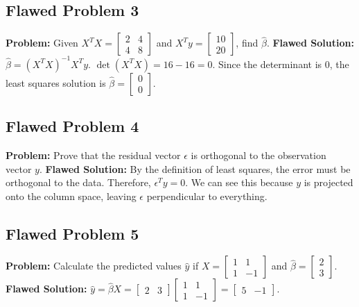 \documentclass[11pt, letterpaper]{article}
\theoremstyle{definition}
\theoremstyle{remark}
\begin{document}
\subsection*{Flawed Problem 3}
\textbf{Problem:} Given $X^T X = \begin{bmatrix} 2 & 4 \\ 4 & 8 \end{bmatrix}$ and $X^T y = \begin{bmatrix} 10 \\ 20 \end{bmatrix}$, find $\hat{\beta}$.
\textbf{Flawed Solution:}
$\hat{\beta} = (X^T X)^{-1} X^T y$.
$\det(X^T X) = 16 - 16 = 0$. Since the determinant is 0, the least squares solution is $\hat{\beta} = \begin{bmatrix} 0 \\ 0 \end{bmatrix}$.
\vspace{1cm}

\subsection*{Flawed Problem 4}
\textbf{Problem:} Prove that the residual vector $\epsilon$ is orthogonal to the observation vector $y$.
\textbf{Flawed Solution:}
By the definition of least squares, the error must be orthogonal to the data. Therefore, $\epsilon^T y = 0$. We can see this because $y$ is projected onto the column space, leaving $\epsilon$ perpendicular to everything.
\vspace{1cm}

\subsection*{Flawed Problem 5}
\textbf{Problem:} Calculate the predicted values $\hat{y}$ if $X = \begin{bmatrix} 1 & 1 \\ 1 & -1 \end{bmatrix}$ and $\hat{\beta} = \begin{bmatrix} 2 \\ 3 \end{bmatrix}$.
\textbf{Flawed Solution:}
$\hat{y} = \hat{\beta} X = \begin{bmatrix} 2 & 3 \end{bmatrix} \begin{bmatrix} 1 & 1 \\ 1 & -1 \end{bmatrix} = \begin{bmatrix} 5 & -1 \end{bmatrix}$.
\vspace{1cm}
\end{document}
